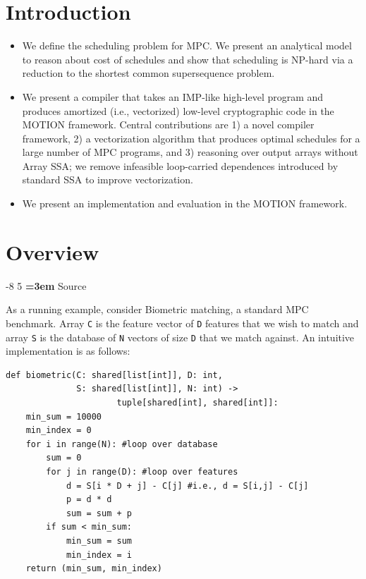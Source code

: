 \documentclass[sigconf, screen, natbib=false, dvipsnames, table]{acmart}
\makeatletter
\renewcommand{\subsection}{\@startsection{subsection}{2}{\z@}%
                        {-8\p@ \@plus -4\p@ \@minus -4\p@}%
                        {5\p@ \@plus 2\p@ \@minus 2\p@}%
                        {\normalfont\Large\bfseries\boldmath
                         \rightskip=\z@ \@plus 3em\pretolerance=10000 }}
\theoremstyle{definition}
\makeatother
\begin{document}
\section{Introduction}
\label{sec:introduction}

\begin{itemize}
\item We define the scheduling problem for MPC. 
We present an analytical model to reason about cost of schedules
and show that scheduling is NP-hard via a reduction to the shortest 
common supersequence problem.

\item We present a compiler that takes an IMP-like high-level 
program and produces amortized (i.e., vectorized) low-level cryptographic 
code in the MOTION framework. Central contributions are 1) a novel compiler framework, 
2) a vectorization algorithm that produces optimal schedules for a large 
number of MPC programs, and 3) reasoning over output arrays without Array SSA; we remove 
infeasible loop-carried dependences introduced by standard SSA to improve vectorization.


\item We present an implementation and evaluation in the MOTION framework. 


\end{itemize}

\section{Overview}
\label{sec:overview}

\subsection{Source}

As a running example, consider Biometric matching, a standard MPC benchmark.
Array \texttt{C} is the feature vector of \texttt{D} features that we wish to match and array \texttt{S} 
is the database of \texttt{N} vectors of size \texttt{D} that we match against.
An intuitive implementation is as follows:

{\small
\begin{verbatim}
def biometric(C: shared[list[int]], D: int, 
              S: shared[list[int]], N: int) -> 
                      tuple[shared[int], shared[int]]:
    min_sum = 10000
    min_index = 0  
    for i in range(N): #loop over database
        sum = 0
        for j in range(D): #loop over features
            d = S[i * D + j] - C[j] #i.e., d = S[i,j] - C[j]
            p = d * d
            sum = sum + p
        if sum < min_sum:
            min_sum = sum
            min_index = i
    return (min_sum, min_index)
\end{verbatim}
}
\end{document}
